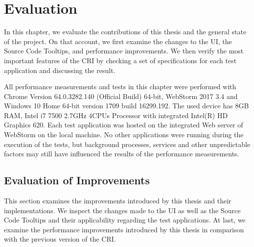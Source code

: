 \chapter{Evaluation}
\label{ch:Evaluation}
In this chapter, we evaluate the contributions of this thesis and the general state of the project. On that account, we first examine the changes to the UI, the Source Code Tooltips, and performance improvements. We then verify the most important features of the CRI by checking a set of specifications for each test application and discussing the result.

All performance measurements and tests in this chapter were performed with Chrome Version 64.0.3282.140 (Official Build) 64-bit, WebStorm 2017 3.4 and Windows 10 Home 64-bit version 1709 build 16299.192. The used device has 8GB RAM, Intel i7 7500 2.7GHz 4CPUs Processor with integrated Intel(R) HD Graphics 620. Each test application was hosted on the integrated Web server of WebStorm on the local machine. No other applications were running during the execution of the tests, but background processes, services and other unpredictable factors may still have influenced the results of the performance measurements.

\section{Evaluation of Improvements}
This section examines the improvements introduced by this thesis and their implementations. We inspect the changes made to the UI as well as the Source Code Tooltips and their applicability regarding the test applications. At last, we examine the performance improvements introduced by this thesis in comparison with the previous version of the CRI.

